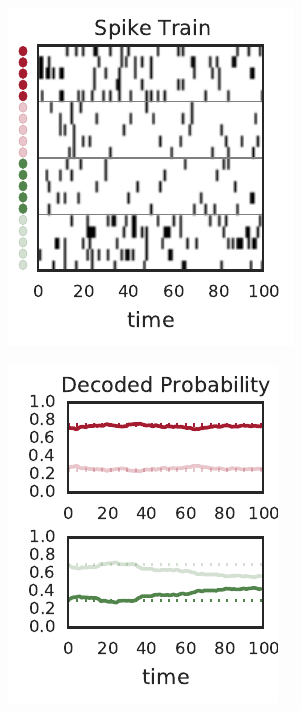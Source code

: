 \begin{figure}[t!]
\begin{subfigure}[b]{1.9in}
    \includegraphics[width=\textwidth]{figures/ch9/example_spiketrain}
    \label{fig:representation_spiketrain}
  \end{subfigure}
  \begin{subfigure}[b]{1.8in}
    \centering
    \caption{}
    \vspace{-.3in}
    \includegraphics[width=\textwidth]{figures/ch9/example_prs}

\end{subfigure}
\end{figure}
